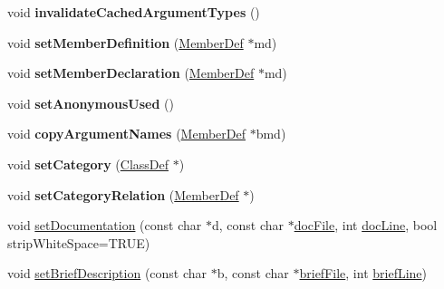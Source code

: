 \begin{DoxyCompactItemize}
\item 
\mbox{\label{class_member_def_a52975bd460c0417b348eee2f569e8230}} 
void {\bfseries invalidate\+Cached\+Argument\+Types} ()
\item 
\mbox{\label{class_member_def_abe245c356b9476451713c813578c7087}} 
void {\bfseries set\+Member\+Definition} (\mbox{\hyperlink{class_member_def}{Member\+Def}} $\ast$md)
\item 
\mbox{\label{class_member_def_a125101c79f875e53eabf17f5d0f76a34}} 
void {\bfseries set\+Member\+Declaration} (\mbox{\hyperlink{class_member_def}{Member\+Def}} $\ast$md)
\item 
\mbox{\label{class_member_def_a4026daffd2f67377931fd8f22f689c97}} 
void {\bfseries set\+Anonymous\+Used} ()
\item 
\mbox{\label{class_member_def_aabddaae5675196ee0cb29d2412538358}} 
void {\bfseries copy\+Argument\+Names} (\mbox{\hyperlink{class_member_def}{Member\+Def}} $\ast$bmd)
\item 
\mbox{\label{class_member_def_a9830608ea05ab14ba7383ab5cf3b5b23}} 
void {\bfseries set\+Category} (\mbox{\hyperlink{class_class_def}{Class\+Def}} $\ast$)
\item 
\mbox{\label{class_member_def_a769a002139a8a3e19c68bc4cf82714ff}} 
void {\bfseries set\+Category\+Relation} (\mbox{\hyperlink{class_member_def}{Member\+Def}} $\ast$)
\item 
void \mbox{\hyperlink{class_member_def_a357486962b5d04cf93dbb52a7a2f2bf6}{set\+Documentation}} (const char $\ast$d, const char $\ast$\mbox{\hyperlink{class_definition_ab09272aa15b4047f0ab77652172cdd4b}{doc\+File}}, int \mbox{\hyperlink{class_definition_a5ecf2e47a19282fbe1dc3413fd73263f}{doc\+Line}}, bool strip\+White\+Space=T\+R\+UE)
\item 
void \mbox{\hyperlink{class_member_def_ac4a25886f70c3888e60c8e5d736720e5}{set\+Brief\+Description}} (const char $\ast$b, const char $\ast$\mbox{\hyperlink{class_definition_a7517dda8109eca884911ac31b42faf3c}{brief\+File}}, int \mbox{\hyperlink{class_definition_a1f87d37cefff16dc8a300795543a7059}{brief\+Line}})
\item 

\end{DoxyCompactItemize}
